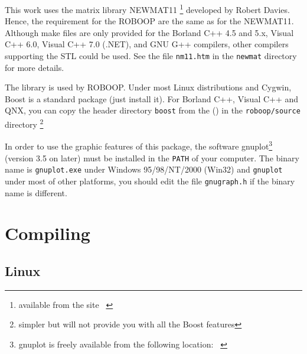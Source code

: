 \documentclass[11pt,fleqn,letterpaper]{report}
\begin{document}
This work uses the matrix library \textsf{NEWMAT11}
\footnote{available from the site {\tt
    }}
developed by Robert Davies. Hence, the requirement for the
\textsf{ROBOOP} are the same as for the \textsf{NEWMAT11}. Although
make files are only provided for the\textsf{ Borland C++} 4.5 and 5.x,
\textsf{Visual C++} 6.0, \textsf{Visual C++} 7.0 (.NET),
and \textsf{GNU G++} compilers, other
compilers supporting the \textsf{STL} could be used.  See the file
{\tt nm11.htm} in the {\tt newmat} directory for more details.

The library 
is used by \textsf{ROBOOP}. Under most \textsf{Linux} distributions
and \textsf{Cygwin}, \textsf{Boost} is a standard package (just
install it). For Borland C++, \textsf{Visual C++} and \textsf{QNX},
you can copy the header directory \texttt{boost} from the 
()
in the \texttt{roboop/source} directory \footnote{simpler but will not
  provide you with all the \textsf{Boost} features}

In order to use the graphic features of this package, the software
\textsf{gnuplot}\footnote{ \textsf{gnuplot} is freely available from
  the following location: {\tt
    }
  } (version 3.5 on later) must be installed in the {\tt PATH} of your
computer. The binary name is {\tt gnuplot.exe} under \textsf{Windows
  95/98/NT/2000} (Win32) and \texttt{gnuplot} under most of other
platforms, you should edit the file \texttt{gnugraph.h} if the
binary name is different.


\section{Compiling}

\subsection{Linux}
\end{document}
